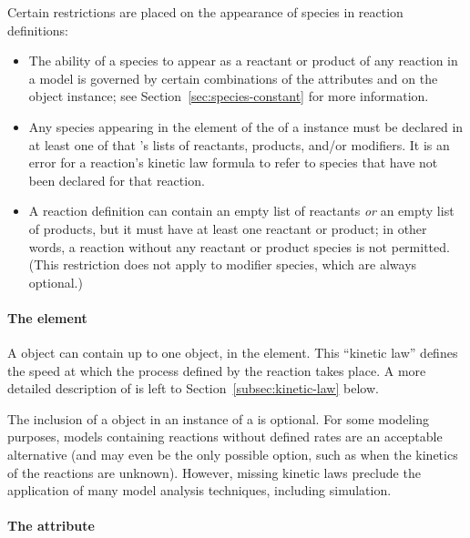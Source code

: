 Certain restrictions are placed on the appearance of species in
reaction definitions:
\begin{itemize}
  
\item The ability of a species to appear as a reactant or product
  of any reaction in a model is governed by certain combinations
  of the attributes  and 
  on the \Species object instance; see
  Section~\ref{sec:species-constant} for more information.
  
\item Any species appearing in the  element of the
   of a \Reaction instance must be declared in
  at least one of that \Reaction's lists of reactants, products,
  and/or modifiers.  It is an error for a reaction's kinetic law
  formula to refer to species that have not been declared for that
  reaction.
  
\item A reaction definition can contain an empty list of reactants
  \emph{or} an empty list of products, but it must have at least
  one reactant or product; in other words, a reaction without any
  reactant or product species is not permitted.  (This restriction
  does not apply to modifier species, which are always optional.)

\end{itemize}


\paragraph{The  element}

A \Reaction object can contain up to one \KineticLaw object, in
the  element.  This ``kinetic law'' defines the
speed at which the process defined by the reaction takes place.  A
more detailed description of \KineticLaw is left to
Section~\ref{subsec:kinetic-law} below.

The inclusion of a \KineticLaw object in an instance of a
\Reaction is optional.  For some modeling purposes, models
containing reactions without defined rates are an acceptable
alternative (and may even be the only possible option, such as
when the kinetics of the reactions are unknown).  However, missing
kinetic laws preclude the application of many model analysis
techniques, including simulation.


\paragraph{The  attribute}
\label{sec:reversible}

